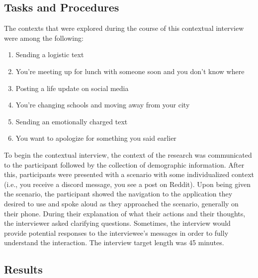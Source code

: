 \documentclass[acmsmall,screen,authorversion,nonacm]{acmart}
\begin{document}
\subsection{Tasks and Procedures}
The contexts that were explored during the course of this contextual interview were among the following:
\begin{enumerate}
    \item Sending a logistic text
    \item You’re meeting up for lunch with someone soon and you don’t know where
    \item Posting a life update on social media
    \item You’re changing schools and moving away from your city
    \item Sending an emotionally charged text
    \item You want to apologize for something you said earlier
\end{enumerate}

To begin the contextual interview, the context of the research was communicated to the participant followed by the collection of demographic information. After this, participants were presented with a scenario with some individualized context (i.e., you receive a discord message, you see a post on Reddit). Upon being given the scenario, the participant showed the navigation to the application they desired to use and spoke aloud as they approached the scenario, generally on their phone. During their explanation of what their actions and their thoughts, the interviewer asked clarifying questions. Sometimes, the interview would provide potential responses to the interviewee’s messages in order to fully understand the interaction. The interview target length was 45 minutes.

\subsection{Results}
\end{document}
